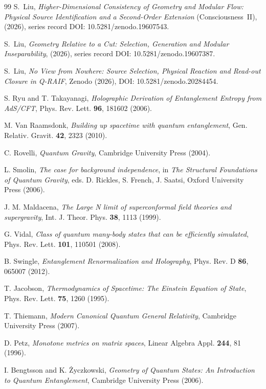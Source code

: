\begin{thebibliography}{99}
S.~Liu, \emph{Higher-Dimensional Consistency of Geometry and Modular Flow: Physical Source Identification and a Second-Order Extension} (Consciousness~II), (2026), series record DOI: 10.5281/zenodo.19607543.

S.~Liu, \emph{Geometry Relative to a Cut: Selection, Generation and Modular Inseparability}, (2026), series record DOI: 10.5281/zenodo.19607387.

S.~Liu, \emph{No View from Nowhere: Source Selection, Physical Reaction and Read-out Closure in Q-RAIF}, Zenodo (2026), DOI: 10.5281/zenodo.20284454.

S. Ryu and T. Takayanagi, \emph{Holographic Derivation of Entanglement Entropy from AdS/CFT}, Phys. Rev. Lett. \textbf{96}, 181602 (2006).

M. Van Raamsdonk, \emph{Building up spacetime with quantum entanglement}, Gen. Relativ. Gravit. \textbf{42}, 2323 (2010).

C. Rovelli, \emph{Quantum Gravity}, Cambridge University Press (2004).

L. Smolin, \emph{The case for background independence}, in \emph{The Structural Foundations of Quantum Gravity}, eds. D. Rickles, S. French, J. Saatsi, Oxford University Press (2006).

J. M. Maldacena, \emph{The Large N limit of superconformal field theories and supergravity}, Int. J. Theor. Phys. \textbf{38}, 1113 (1999).

G. Vidal, \emph{Class of quantum many-body states that can be efficiently simulated}, Phys. Rev. Lett. \textbf{101}, 110501 (2008).

B. Swingle, \emph{Entanglement Renormalization and Holography}, Phys. Rev. D \textbf{86}, 065007 (2012).

T. Jacobson, \emph{Thermodynamics of Spacetime: The Einstein Equation of State}, Phys. Rev. Lett. \textbf{75}, 1260 (1995).

T. Thiemann, \emph{Modern Canonical Quantum General Relativity}, Cambridge University Press (2007).

D. Petz, \emph{Monotone metrics on matrix spaces}, Linear Algebra Appl. \textbf{244}, 81 (1996).

I. Bengtsson and K. \.Zyczkowski, \emph{Geometry of Quantum States: An Introduction to Quantum Entanglement}, Cambridge University Press (2006).


\end{thebibliography}
